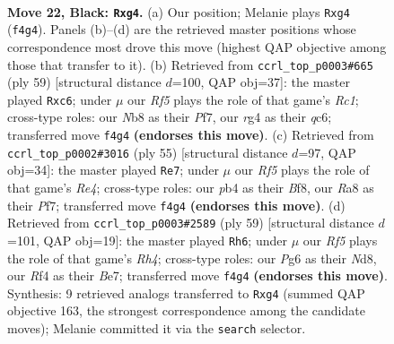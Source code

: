 \documentclass[11pt]{article}
\begin{document}
\clearpage

\begin{figure}[p]\centering
\begin{subfigure}{0.46\textwidth}\centering
\resizebox{\linewidth}{!}{%
\newchessgame
\chessboard[
  setfen={rn6/pp1bk3/1p2p1p1/1P1pP3/1P1P1rR1/2N5/8/3QKBN1 b - - 0 22},
  showmover=false,
  pgfstyle=straightmove, color=movearrow, markmove={f4-g4}
]}
\caption{}
\end{subfigure}\hfill
\begin{subfigure}{0.46\textwidth}\centering
\resizebox{\linewidth}{!}{%
\newchessgame
\chessboard[
  setfen={2r3k1/5p2/2Qb2pp/p7/1p2Rp2/1P3N1P/1PP2PP1/6K1 b - - 0 30},
  showmover=false,
  pgfstyle=straightmove, color=movearrow, markmove={c8-c6}
]}
\caption{}
\end{subfigure}
\\[4pt]
\begin{subfigure}{0.46\textwidth}\centering
\resizebox{\linewidth}{!}{%
\newchessgame
\chessboard[
  setfen={5bk1/5pp1/3p4/1QpPr3/3pNP1p/qP1P3P/6P1/5RK1 b - - 0 28},
  showmover=false,
  pgfstyle=straightmove, color=movearrow, markmove={e5-e7}
]}
\caption{}
\end{subfigure}\hfill
\begin{subfigure}{0.46\textwidth}\centering
\resizebox{\linewidth}{!}{%
\newchessgame
\chessboard[
  setfen={2kn4/2p1b3/1p2p3/p4pNr/5P1p/1PPR3P/1P3BP1/6K1 b - - 3 30},
  showmover=false,
  pgfstyle=straightmove, color=movearrow, markmove={h5-h6}
]}
\caption{}
\end{subfigure}
\caption{\textbf{Move 22, Black: \texttt{Rxg4}.} (a) Our position; Melanie plays \texttt{Rxg4} (\texttt{f4g4}). Panels (b)--(d) are the retrieved master positions whose correspondence most drove this move (highest QAP objective among those that transfer to it). (b) Retrieved from \texttt{ccrl\_top\_p0003\#665} (ply 59) [structural distance $d$=100, QAP obj=37]: the master played \texttt{Rxc6}; under $\mu$ our \emph{Rf5} plays the role of that game's \emph{Rc1}; cross-type roles: our \emph{N}b8 as their \emph{P}f7, our \emph{r}g4 as their \emph{q}c6; transferred move \texttt{f4g4} \textbf{(endorses this move)}. (c) Retrieved from \texttt{ccrl\_top\_p0002\#3016} (ply 55) [structural distance $d$=97, QAP obj=34]: the master played \texttt{Re7}; under $\mu$ our \emph{Rf5} plays the role of that game's \emph{Re4}; cross-type roles: our \emph{p}b4 as their \emph{B}f8, our \emph{R}a8 as their \emph{P}f7; transferred move \texttt{f4g4} \textbf{(endorses this move)}. (d) Retrieved from \texttt{ccrl\_top\_p0003\#2589} (ply 59) [structural distance $d$=101, QAP obj=19]: the master played \texttt{Rh6}; under $\mu$ our \emph{Rf5} plays the role of that game's \emph{Rh4}; cross-type roles: our \emph{P}g6 as their \emph{N}d8, our \emph{R}f4 as their \emph{B}e7; transferred move \texttt{f4g4} \textbf{(endorses this move)}. Synthesis: 9 retrieved analogs transferred to \texttt{Rxg4} (summed QAP objective 163, the strongest correspondence among the candidate moves); Melanie committed it via the \texttt{search} selector.}
\label{fig:thought-m43}
\end{figure}
\end{document}
